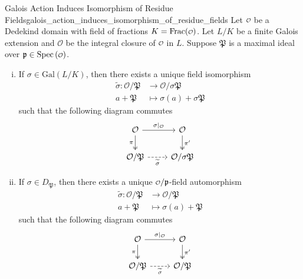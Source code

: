 \begin{lemma}{Galois Action Induces Isomorphism of Residue Fields}{galois_action_induces_isomorphism_of_residue_fields}
    Let $\mathcalo$ be a Dedekind domain with field of fractions $K=\mathrm{Frac}(\mathcalo)$. Let $L/K$ be a finite Galois extension and $\mathcal{O}$ be the integral closure of $\mathcalo$ in $L$. Suppose $\mathfrak{P}$ is a maximal ideal over $\mathfrak{p}\in \spec\left(\mathcalo\right)$.
    \begin{enumerate}[(i)]
        \item If $\sigma\in \mathrm{Gal}(L/K)$, then there exists a unique field isomorphism
    \begin{align*}
        \widetilde{\sigma}:\mathcal{O}/\mathfrak{P}&\longrightarrow \mathcal{O}/\sigma\mathfrak{P}\\
        a+\mathfrak{P}&\longmapsto \sigma(a)+\sigma\mathfrak{P}
    \end{align*}
    such that the following diagram commutes
    \[
        \begin{tikzcd}
            \mathcal{O} \arrow[r, "\sigma|_{\mathcal{O}}"] \arrow[d, "\pi"', two heads] & \mathcal{O} \arrow[d, "\pi'", two heads] \\
            \mathcal{O}/\mathfrak{P} \arrow[r, "\widetilde{\sigma}"', dashed]                         & \mathcal{O}/\sigma\mathfrak{P}          
        \end{tikzcd}
    \]
    \item If $\sigma\in D_{\mathfrak{P}}$, then there exists a unique $\mathcalo/\mathfrak{p}$-field automorphism
    \begin{align*}
        \widetilde{\sigma}:\mathcal{O}/\mathfrak{P}&\longrightarrow \mathcal{O}/\mathfrak{P}\\
        a+\mathfrak{P}&\longmapsto \sigma(a)+\mathfrak{P}
    \end{align*}
    such that the following diagram commutes
    \[
        \begin{tikzcd}
            \mathcal{O} \arrow[r, "\sigma|_{\mathcal{O}}"] \arrow[d, "\pi"', two heads] & \mathcal{O} \arrow[d, "\pi'", two heads] \\
            \mathcal{O}/\mathfrak{P} \arrow[r, "\widetilde{\sigma}"', dashed]                         & \mathcal{O}/\mathfrak{P}          
        \end{tikzcd}
    \]
    \end{enumerate}
    
\end{lemma}
